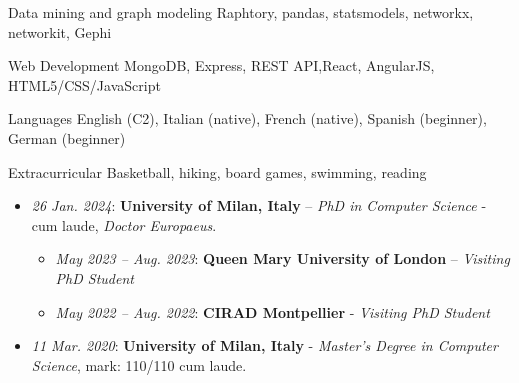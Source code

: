\documentclass[11pt, a4paper]{awesome-cv}
\begin{document}
\begin{refsection}
\begin{cvskills}
  \cvskill
    {Data mining and graph modeling} %
    {Raphtory, pandas, statsmodels, networkx, networkit, Gephi} %

  \cvskill
    {Web Development} %
    {MongoDB, Express, REST API,React, AngularJS, HTML5/CSS/JavaScript} %


  \cvskill
    {Languages} %
    {English (C2), Italian (native), French (native), Spanish (beginner), German (beginner) } %
    
    \cvskill
    {Extracurricular} %
    {Basketball, hiking, board games, swimming, reading} 
\end{cvskills}


\begin{itemize}
\item \textit{26 Jan. 2024}: \textbf{University of Milan, Italy} – \textit{PhD in Computer Science} - cum laude, \textit{Doctor Europaeus}.



\begin{itemize}
    \item \textit{May 2023 – Aug. 2023}: \textbf{Queen Mary University of London} – \textit{Visiting PhD Student}

    \item \textit{May 2022 – Aug. 2022}: \textbf{CIRAD Montpellier} - \textit{Visiting PhD Student}
\end{itemize}

    \item \textit{11 Mar. 2020}: \textbf{University of Milan, Italy} - \textit{Master's Degree in Computer Science}, mark: 110/110 cum laude.
\end{itemize}








\end{refsection}
\end{document}
